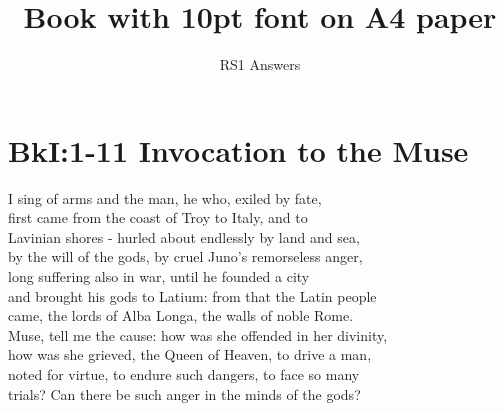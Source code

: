 \documentclass[10pt, a5paper, titlepage]{book}
\title{Book with 10pt font on A4 paper}
\author{RS1 Answers}
\date{}
\begin{document}
\maketitle

\section*{BkI:1-11 Invocation to the Muse}
I sing of arms and the man, he who, exiled by fate,\\
first came from the coast of Troy to Italy, and to\\
Lavinian shores - hurled about endlessly by land and sea,\\
by the will of the gods, by cruel Juno's remorseless anger,\\
long suffering also in war, until he founded a city\\
and brought his gods to Latium: from that the Latin people\\
came, the lords of Alba Longa, the walls of noble Rome.\\
Muse, tell me the cause: how was she offended in her divinity,\\
how was she grieved, the Queen of Heaven, to drive a man,\\
noted for virtue, to endure such dangers, to face so many\\
trials? Can there be such anger in the minds of the gods?

\end{document}
